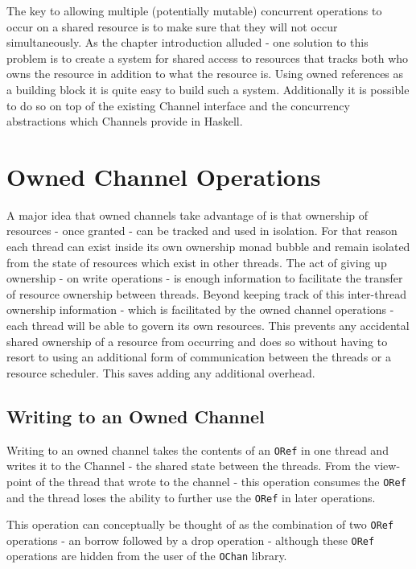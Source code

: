 \documentclass[onehalf,11pt]{beavtex}
\begin{document}
The key to allowing multiple (potentially mutable) concurrent operations to occur
on a shared resource is to make sure that they will not occur simultaneously.
As the chapter introduction alluded - one solution to this problem is to
create a system for shared access to resources that tracks both who owns the
resource in addition to what the resource is.
Using owned references as a building block it is quite easy to build
such a system. Additionally it is possible to do so on top of the existing
Channel interface and the concurrency abstractions which Channels provide in
Haskell.


\section{Owned Channel Operations}

A major idea that owned channels take advantage of is that ownership
of resources - once granted - can be tracked and used in isolation. For that reason
each thread can exist inside its own ownership monad bubble and
remain isolated from the state of resources which exist in other threads.
The act of giving up ownership - on write operations - is enough information to
facilitate the transfer of resource ownership between threads.
Beyond keeping track of this inter-thread ownership information - which is
facilitated by the owned channel operations - each thread will be able
to govern its own resources.  This prevents any accidental shared ownership of
a resource from occurring and does so without having to resort to using an
additional form of communication between the threads or a resource scheduler.
This saves adding any additional overhead.



\subsection{Writing to an Owned Channel}

Writing to an owned channel takes the contents of an \texttt{ORef} in
one thread and writes it to the Channel - the shared state between the threads.
From the view-point of the thread that wrote to the channel - this operation
consumes the \texttt{ORef} and the thread loses the ability to further use the
\texttt{ORef} in later operations.

This operation can conceptually be thought of as the combination of two
\texttt{ORef} operations - an borrow followed by a drop operation -
although these \texttt{ORef} operations are hidden from the user of the
\texttt{OChan} library.
\end{document}
